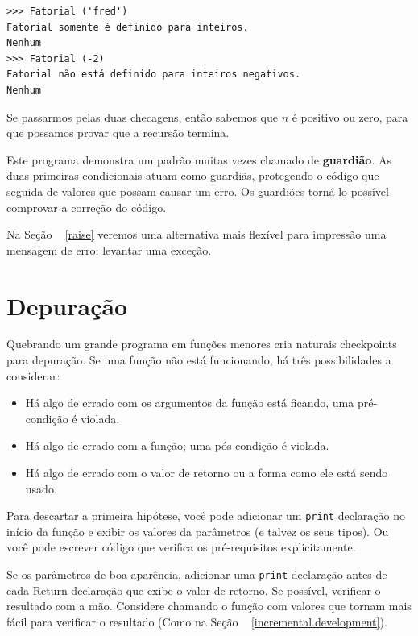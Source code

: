 \documentclass[10pt]{book}
\begin{document}
\begin{exercise}
{{\begin{verbatim}
>>> Fatorial ('fred')
Fatorial somente é definido para inteiros.
Nenhum
>>> Fatorial (-2)
Fatorial não está definido para inteiros negativos.
Nenhum
\end{verbatim}
% 
Se passarmos pelas duas checagens, então sabemos que $ n $ é positivo ou
zero, para que possamos provar que a recursão termina.

Este programa demonstra um padrão muitas vezes chamado de {\bf guardião}.
As duas primeiras condicionais atuam como guardiãs, protegendo o código que
seguida de valores que possam causar um erro. Os guardiões torná-lo
possível comprovar a correção do código.

Na Seção ~ \ref{raise} veremos uma alternativa mais flexível para impressão
uma mensagem de erro: levantar uma exceção.


\section{Depuração}
\label{factdebug}

Quebrando um grande programa em funções menores cria naturais
checkpoints para depuração. 
Se uma função não está funcionando, há
três possibilidades a considerar:

\begin{itemize}

\item Há algo de errado com os argumentos da função
está ficando, uma pré-condição é violada.

\item Há algo de errado com a função; uma pós-condição
é violada.

\item Há algo de errado com o valor de retorno ou a
forma como ele está sendo usado.

\end{itemize}

Para descartar a primeira hipótese, você pode adicionar um {\tt print} declaração
no início da função e exibir os valores da
parâmetros (e talvez os seus tipos). Ou você pode escrever código
que verifica os pré-requisitos explicitamente.

Se os parâmetros de boa aparência, adicionar uma {\tt print} declaração antes de cada
{Return \tt} declaração que exibe o valor de retorno. Se
possível, verificar o resultado com a mão. Considere chamando o
função com valores que tornam mais fácil para verificar o resultado
(Como na Seção ~ \ref {incremental.development}).

}}
\end{exercise}
\end{document}
